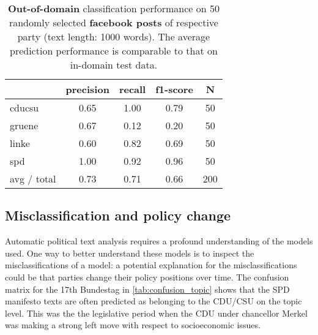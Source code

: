 \documentclass[11pt]{article}
\begin{document}
\begin{table}[t]
\caption{
\label{tab:results_fb}
{\bf  Out-of-domain} classification performance on 50 randomly selected {\bf facebook posts} of respective party (text length: 1000 words). The average prediction performance is comparable to that on in-domain test data.}
\begin{center}
\begin{tabular}{lcccc}
    &         precision    &recall &  f1-score  & N  \\
    \hline
        \hline
 cducsu     &  0.65     & 1.00  &    0.79     &   50\\
     gruene   &    0.67   &   0.12  &    0.20   &     50\\
      linke       &0.60    &  0.82    &  0.69    &    50\\
        spd       &1.00 &     0.92   &   0.96    &    50\\
\hline
avg / total    &   0.73   &   0.71  &    0.66   &    200\\
\end{tabular}
\end{center}

\end{table}


\subsection{Misclassification and policy change}
Automatic political text analysis requires a profound understanding of the models used. One way to better understand these models is to inspect the misclassifications of a model: a potential explanation for the misclassifications could be that parties change their policy positions over time. 
The confusion matrix for the 17th Bundestag in \autoref{tab:confusion_topic} shows that the SPD manifesto texts are often predicted as belonging to the CDU/CSU on the topic level. This was the the legislative period when the CDU under chancellor Merkel was making a strong left move with respect to socioeconomic issues. \\
\end{document}

